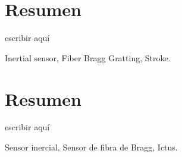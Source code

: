 \chapter*{Resumen}

\begin{abstractEn} 
escribir aquí



\end{abstractEn}

\begin{keywordsEn}
Inertial sensor, Fiber Bragg Gratting, Stroke.
\end{keywordsEn}

\chapter*{Resumen}

\begin{abstractEs}
 escribir aquí



\end{abstractEs}

\begin{keywordsEs}
Sensor inercial, Sensor de fibra de Bragg, Ictus.
\end{keywordsEs}
